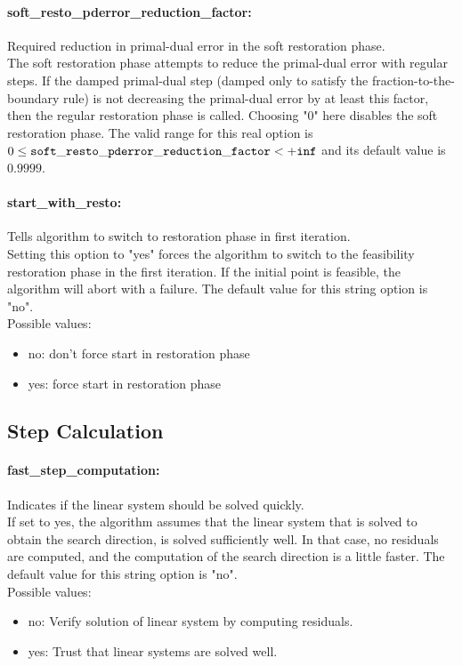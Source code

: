 \paragraph{soft\_resto\_pderror\_reduction\_factor:}\label{opt:soft_resto_pderror_reduction_factor} Required reduction in primal-dual error in the soft restoration phase. \\
 The soft restoration phase attempts to reduce the primal-dual error with regular steps. If the damped primal-dual step (damped only to satisfy the fraction-to-the-boundary rule) is not decreasing the primal-dual error by at least this factor, then the regular restoration phase is called. Choosing "0" here disables the soft restoration phase. The valid range for this real option is 
$0 \le {\tt soft\_resto\_pderror\_reduction\_factor } <  {\tt +inf}$
and its default value is $0.9999$.


\paragraph{start\_with\_resto:}\label{opt:start_with_resto} Tells algorithm to switch to restoration phase in first iteration. \\
 Setting this option to "yes" forces the algorithm to switch to the feasibility restoration phase in the first iteration. If the initial point is feasible, the algorithm will abort with a failure. The default value for this string option is "no".
\\ 
Possible values:
\begin{itemize}
   \item no: don't force start in restoration phase
   \item yes: force start in restoration phase
\end{itemize}

\subsection{Step Calculation}
\label{sec:StepCalculation}
\paragraph{fast\_step\_computation:}\label{opt:fast_step_computation} Indicates if the linear system should be solved quickly. \\
 If set to yes, the algorithm assumes that the linear system that is solved to obtain the search direction, is solved sufficiently well. In that case, no residuals are computed, and the computation of the search direction is a little faster. The default value for this string option is "no".
\\ 
Possible values:
\begin{itemize}
   \item no: Verify solution of linear system by computing residuals.
   \item yes: Trust that linear systems are solved well.
\end{itemize}

